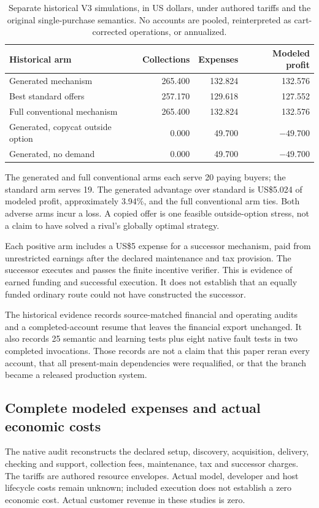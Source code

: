 \begin{table}[ht]
\small\centering
\begin{tabularx}{\linewidth}{@{}Yrrr@{}}\toprule
Historical arm & Collections & Expenses & Modeled profit\\\midrule
Generated mechanism & 265.400 & 132.824 & 132.576\\
Best standard offers & 257.170 & 129.618 & 127.552\\
Full conventional mechanism & 265.400 & 132.824 & 132.576\\
Generated, copycat outside option & 0.000 & 49.700 & $-49.700$\\
Generated, no demand & 0.000 & 49.700 & $-49.700$\\\bottomrule
\end{tabularx}
\caption{Separate historical V3 simulations, in US dollars, under authored tariffs and the original single-purchase semantics. No accounts are pooled, reinterpreted as cart-corrected operations, or annualized.}
\label{tab:v3finance}
\end{table}

The generated and full conventional arms each serve 20 paying buyers; the standard arm serves 19. The generated advantage over standard is US\$5.024 of modeled profit, approximately 3.94\%, and the full conventional arm ties. Both adverse arms incur a loss. A copied offer is one feasible outside-option stress, not a claim to have solved a rival's globally optimal strategy.

Each positive arm includes a US\$5 expense for a successor mechanism, paid from unrestricted earnings after the declared maintenance and tax provision. The successor executes and passes the finite incentive verifier. This is evidence of earned funding and successful execution. It does not establish that an equally funded ordinary route could not have constructed the successor.

The historical evidence records source-matched financial and operating audits and a completed-account resume that leaves the financial export unchanged. It also records 25 semantic and learning tests plus eight native fault tests in two completed invocations. Those records are not a claim that this paper reran every account, that all present-main dependencies were requalified, or that the branch became a released production system.

\subsection{Complete modeled expenses and actual economic costs}
The native audit reconstructs the declared setup, discovery, acquisition, delivery, checking and support, collection fees, maintenance, tax and successor charges. The tariffs are authored resource envelopes. Actual model, developer and host lifecycle costs remain unknown; included execution does not establish a zero economic cost. Actual customer revenue in these studies is zero.

